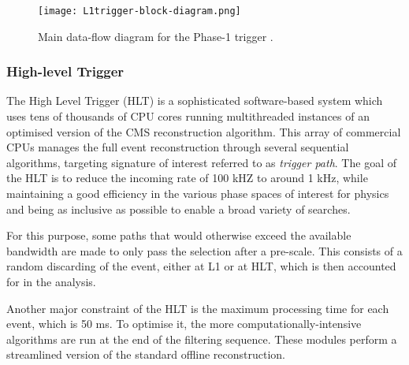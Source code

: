 \begin{figure}[thb]
  \centering
  \texttt{[image: L1trigger-block-diagram.png]}
  \caption{Main data-flow diagram for the Phase-1 \Lone trigger \cite{CMS-TDR-12}.}
  \label{fig:L1trigger-block-diagram}
\end{figure}

\subsubsection{High-level Trigger}
The High Level Trigger (HLT) is a sophisticated software-based system which uses tens of thousands of CPU cores
running multithreaded instances of an optimised version of the CMS reconstruction algorithm.
This array of commercial CPUs manages the full event reconstruction through several sequential algorithms,
targeting signature of interest referred to as \textit{trigger path}.
The goal of the HLT is to reduce the incoming \Lone rate of 100 kHZ to around 1 kHz,
while maintaining a good efficiency in the various phase spaces of interest for physics
and being as inclusive as possible to enable a broad variety of searches.

For this purpose, some paths that would otherwise exceed the available bandwidth are made to only pass the selection after a pre-scale.
This consists of a random discarding of the event, either at L1 or at HLT, which is then accounted for in the analysis.

Another major constraint of the HLT is the maximum processing time for each event, which is 50 ms.
To optimise it, the more computationally-intensive algorithms are run at the end of the filtering sequence.
These modules perform a streamlined version of the standard offline reconstruction.

